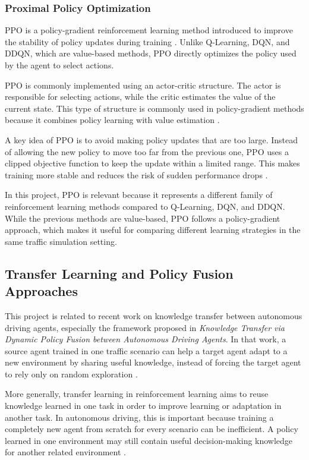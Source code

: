 \documentclass{article}
\begin{document}
\subsubsection{Proximal Policy Optimization}

PPO is a policy-gradient reinforcement learning method introduced to improve the stability of policy updates during training \cite{schulman2017proximal}. Unlike Q-Learning, DQN, and DDQN, which are value-based methods, PPO directly optimizes the policy used by the agent to select actions.

PPO is commonly implemented using an actor-critic structure. The actor is responsible for selecting actions, while the critic estimates the value of the current state. This type of structure is commonly used in policy-gradient methods because it combines policy learning with value estimation \cite{sutton2018reinforcement}.

A key idea of PPO is to avoid making policy updates that are too large. Instead of allowing the new policy to move too far from the previous one, PPO uses a clipped objective function to keep the update within a limited range. This makes training more stable and reduces the risk of sudden performance drops \cite{schulman2017proximal}.

In this project, PPO is relevant because it represents a different family of reinforcement learning methods compared to Q-Learning, DQN, and DDQN. While the previous methods are value-based, PPO follows a policy-gradient approach, which makes it useful for comparing different learning strategies in the same traffic simulation setting.


\subsection{Transfer Learning and Policy Fusion Approaches}

This project is related to recent work on knowledge transfer between autonomous driving agents, especially the framework proposed in \textit{Knowledge Transfer via Dynamic Policy Fusion between Autonomous Driving Agents}. In that work, a source agent trained in one traffic scenario can help a target agent adapt to a new environment by sharing useful knowledge, instead of forcing the target agent to rely only on random exploration \cite{maad2025dynamic}.

More generally, transfer learning in reinforcement learning aims to reuse knowledge learned in one task in order to improve learning or adaptation in another task. In autonomous driving, this is important because training a completely new agent from scratch for every scenario can be inefficient. A policy learned in one environment may still contain useful decision-making knowledge for another related environment \cite{maad2025dynamic}.
\end{document}

